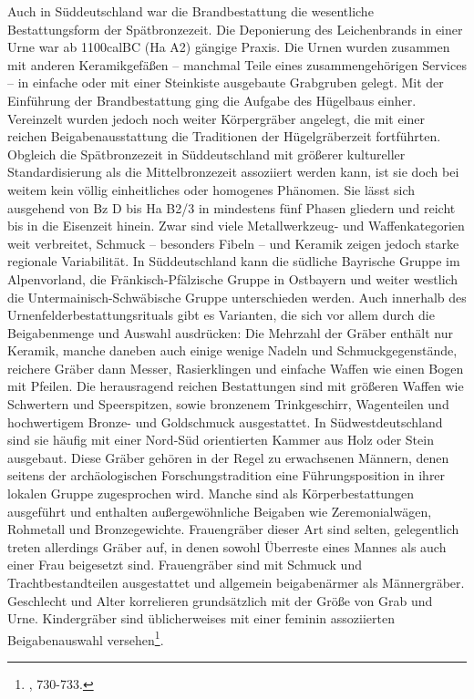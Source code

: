\documentclass[openany,twoside,twocolumn]{book}
\let\rmarkdownfootnote\footnote%
\def\footnote{\protect\rmarkdownfootnote}
\begin{document}
Auch in Süddeutschland war die Brandbestattung die wesentliche Bestattungsform der Spätbronzezeit. Die Deponierung des Leichenbrands in einer Urne war ab 1100calBC (Ha A2) gängige Praxis. Die Urnen wurden zusammen mit anderen Keramikgefäßen -- manchmal Teile eines zusammengehörigen Services -- in einfache oder mit einer Steinkiste ausgebaute Grabgruben gelegt. Mit der Einführung der Brandbestattung ging die Aufgabe des Hügelbaus einher. Vereinzelt wurden jedoch noch weiter Körpergräber angelegt, die mit einer reichen Beigabenausstattung die Traditionen der Hügelgräberzeit fortführten. Obgleich die Spätbronzezeit in Süddeutschland mit größerer kultureller Standardisierung als die Mittelbronzezeit assoziiert werden kann, ist sie doch bei weitem kein völlig einheitliches oder homogenes Phänomen. Sie lässt sich ausgehend von Bz D bis Ha B2/3 in mindestens fünf Phasen gliedern und reicht bis in die Eisenzeit hinein. Zwar sind viele Metallwerkzeug- und Waffenkategorien weit verbreitet, Schmuck -- besonders Fibeln -- und Keramik zeigen jedoch starke regionale Variabilität. In Süddeutschland kann die südliche Bayrische Gruppe im Alpenvorland, die Fränkisch-Pfälzische Gruppe in Ostbayern und weiter westlich die Untermainisch-Schwäbische Gruppe unterschieden werden. Auch innerhalb des Urnenfelderbestattungsrituals gibt es Varianten, die sich vor allem durch die Beigabenmenge und Auswahl ausdrücken: Die Mehrzahl der Gräber enthält nur Keramik, manche daneben auch einige wenige Nadeln und Schmuckgegenstände, reichere Gräber dann Messer, Rasierklingen und einfache Waffen wie einen Bogen mit Pfeilen. Die herausragend reichen Bestattungen sind mit größeren Waffen wie Schwertern und Speerspitzen, sowie bronzenem Trinkgeschirr, Wagenteilen und hochwertigem Bronze- und Goldschmuck ausgestattet. In Südwestdeutschland sind sie häufig mit einer Nord-Süd orientierten Kammer aus Holz oder Stein ausgebaut. Diese Gräber gehören in der Regel zu erwachsenen Männern, denen seitens der archäologischen Forschungstradition eine Führungsposition in ihrer lokalen Gruppe zugesprochen wird. Manche sind als Körperbestattungen ausgeführt und enthalten außergewöhnliche Beigaben wie Zeremonialwägen, Rohmetall und Bronzegewichte. Frauengräber dieser Art sind selten, gelegentlich treten allerdings Gräber auf, in denen sowohl Überreste eines Mannes als auch einer Frau beigesetzt sind. Frauengräber sind mit Schmuck und Trachtbestandteilen ausgestattet und allgemein beigabenärmer als Männergräber. Geschlecht und Alter korrelieren grundsätzlich mit der Größe von Grab und Urne. Kindergräber sind üblicherweises mit einer feminin assoziierten Beigabenauswahl versehen\footnote{\textcite{jockenhovel_germany_2013}, 730-733.}.
\end{document}
